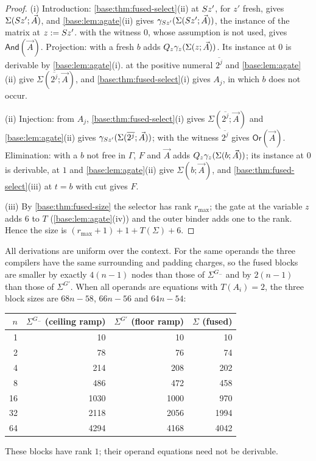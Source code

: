 \begin{proof}
(i) Introduction: \cref{base:thm:fused-select}(ii) at $S z'$, for $z'$
fresh, gives $\Sigma(S z';\vec A)$, and \cref{base:lem:agate}(ii) gives
$\gamma_{S z'}(\Sigma(S z';\vec A))$, the instance of the matrix at
$z\mathrel{:=}S z'$.   with the witness $0$, whose assumption is not
used, gives $\mathsf{And}(\vec A)$.  Projection:  with a fresh
$b$ adds $Q_{z}\gamma_z(\Sigma(z;\vec A))$.  Its instance at $0$ is
derivable by \cref{base:lem:agate}(i).   at the positive
numeral $\overline{2^j}$ and \cref{base:lem:agate}(ii) give
$\Sigma(\overline{2^j};\vec A)$, and \cref{base:thm:fused-select}(i) gives
$A_j$, in which $b$ does not occur.

(ii) Injection: from $A_j$, \cref{base:thm:fused-select}(i) gives
$\Sigma(\overline{2^j};\vec A)$ and \cref{base:lem:agate}(ii) gives
$\gamma_{S z'}(\Sigma(\overline{2^j};\vec A))$;  with the
witness $\overline{2^j}$ gives $\mathsf{Or}(\vec A)$.  Elimination:
 with a $b$ not free in $\Gamma$, $F$ and $\vec A$ adds
$Q_{z}\gamma_z(\Sigma(b;\vec A))$; its instance at $0$ is derivable,
 at $1$ and \cref{base:lem:agate}(ii) give
$\Sigma(b;\vec A)$, and \cref{base:thm:fused-select}(iii) at $t=b$ with cut
gives $F$.

(iii) By \cref{base:thm:fused-size} the selector has rank $r_{\max}$; the
gate at the variable $z$ adds $6$ to $T$ (\cref{base:lem:agate}(iv)) and the
outer binder adds one to the rank.  Hence the size is
$(r_{\max}+1)+1+T(\Sigma)+6$.
\end{proof}

All derivations are uniform over the context.  For the same operands the
three compilers have the same surrounding and padding charges, so the fused
blocks are smaller by exactly $4(n-1)$ nodes than those of
$\Sigma^{G_-}$ and by $2(n-1)$ than those of $\Sigma^{G'}$.  When all
operands are equations with $T(A_i)=2$, the three block sizes are $68n-58$,
$66n-56$ and $64n-54$:
\begin{center}
\begin{tabular}{rrrr}
\toprule
$n$ & $\Sigma^{G_-}$ (ceiling ramp) & $\Sigma^{G'}$ (floor ramp) & $\Sigma$ (fused)\\
\midrule
1  & 10   & 10   & 10\\
2  & 78   & 76   & 74\\
4  & 214  & 208  & 202\\
8  & 486  & 472  & 458\\
16 & 1030 & 1000 & 970\\
32 & 2118 & 2056 & 1994\\
64 & 4294 & 4168 & 4042\\
\bottomrule
\end{tabular}
\end{center}
These blocks have rank $1$; their operand equations need not be derivable.

